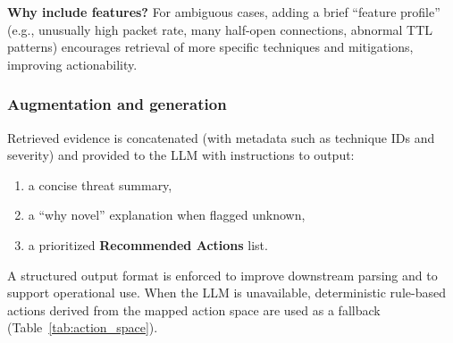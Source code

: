 \documentclass[conference]{IEEEtran}
\begin{document}
\textbf{Why include features?} For ambiguous cases, adding a brief ``feature profile'' (e.g., unusually high packet rate, many half-open connections, abnormal TTL patterns) encourages retrieval of more specific techniques and mitigations, improving actionability.

\subsubsection{Augmentation and generation}
Retrieved evidence is concatenated (with metadata such as technique IDs and severity) and provided to the LLM with instructions to output:
\begin{enumerate}
  \item a concise threat summary,
  \item a ``why novel'' explanation when flagged unknown,
  \item a prioritized \textbf{Recommended Actions} list.
\end{enumerate}
A structured output format is enforced to improve downstream parsing and to support operational use. When the LLM is unavailable, deterministic rule-based actions derived from the mapped action space are used as a fallback (Table~\ref{tab:action_space}).
\end{document}

